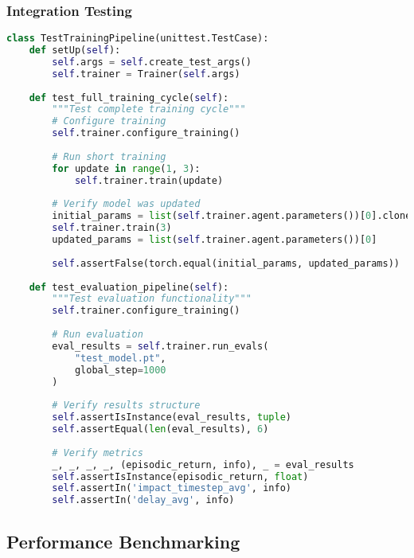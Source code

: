 \documentclass[12pt,a4paper]{article}
\begin{document}
\subsubsection{Integration Testing}
\begin{lstlisting}[language=Python, caption=Integration Testing Framework]
class TestTrainingPipeline(unittest.TestCase):
    def setUp(self):
        self.args = self.create_test_args()
        self.trainer = Trainer(self.args)
    
    def test_full_training_cycle(self):
        """Test complete training cycle"""
        # Configure training
        self.trainer.configure_training()
        
        # Run short training
        for update in range(1, 3):
            self.trainer.train(update)
        
        # Verify model was updated
        initial_params = list(self.trainer.agent.parameters())[0].clone()
        self.trainer.train(3)
        updated_params = list(self.trainer.agent.parameters())[0]
        
        self.assertFalse(torch.equal(initial_params, updated_params))
    
    def test_evaluation_pipeline(self):
        """Test evaluation functionality"""
        self.trainer.configure_training()
        
        # Run evaluation
        eval_results = self.trainer.run_evals(
            "test_model.pt", 
            global_step=1000
        )
        
        # Verify results structure
        self.assertIsInstance(eval_results, tuple)
        self.assertEqual(len(eval_results), 6)
        
        # Verify metrics
        _, _, _, _, (episodic_return, info), _ = eval_results
        self.assertIsInstance(episodic_return, float)
        self.assertIn('impact_timestep_avg', info)
        self.assertIn('delay_avg', info)
\end{lstlisting}

\subsection{Performance Benchmarking}
\end{document}
